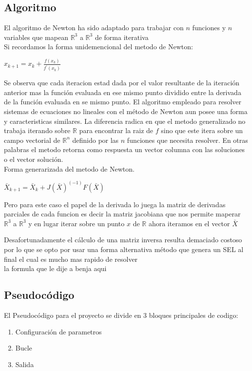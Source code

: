 \documentclass[11pt]{article}
\begin{document}
\subsection{Algoritmo}
El algoritmo de Newton ha sido adaptado para trabajar con $n$ funciones y $n$ variables que mapean $\mathbb{R}^3$ a $\mathbb{R}^3$ de forma iterativa\\

Si recordamos la forma unidemencional del metodo de Newton:\\
\begin{center}
$x_{k+1} = x_{k} + \frac{f(x_{k})}{f^\prime(x_{k})} \label{eq:1}$\\
\end{center}

Se observa que cada iteracion estad dada por el valor resultante de la iteración anterior mas la función evaluada en ese mismo punto dividido entre la derivada de la función evaluada en se mismo punto. El algoritmo empleado para resolver sistemas de ecuaciones no lineales con el método de Newton aun posee una forma y caracteristicas similares. La diferencia radica en que el metodo generalizado no trabaja iterando sobre $\mathbb{R}$ para encontrar la raiz de $f$ sino que este itera sobre un campo vectorial de $\mathbb{R}^n$ definido por las $n$ funciones que necesita resolver. En otras palabras el metodo retorna como respuesta un vector columna con las soluciones o el vector solución.\\

Forma generarizada del metodo de Newton.
 
\begin{center}
$\bar{X}_{k+1} = \bar{X}_{k} + J(\bar{X})^(-1)F(\bar{X})  \label{eq:2}$
\end{center}

Pero para este caso el papel de la derivada lo juega la matriz de derivadas parciales de cada funcion es decir la matriz jacobiana que nos permite maperar  $\mathbb{R}^3$ a $\mathbb{R}^3$ y en lugar iterar sobre un punto $x$ de $\mathbb{R}$  ahora iteramos en el vector $\bar{X}$

Desafortunadamente el cálculo de una matriz inversa resulta demaciado costoso por lo que se opto por usar una forma alternativa método que genera un SEL al final el cual es mucho mas rapido de resolver\\

{la formula que le dije a benja aqui }

\subsection{Pseudocódigo}
El Pseudocódigo para el proyecto se divide en 3 bloques principales de codigo:
\begin{enumerate}
  \item Configuración de parametros
  \item Bucle
  \item Salida
\end{enumerate}
\end{document}
